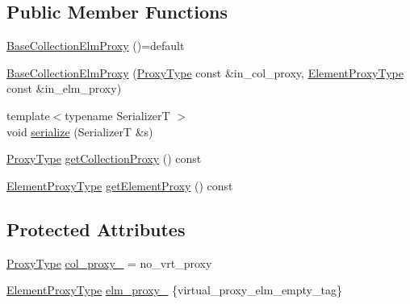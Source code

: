 \subsection*{Public Member Functions}
\begin{DoxyCompactItemize}
\item 
\hyperlink{structvt_1_1vrt_1_1collection_1_1_base_collection_elm_proxy_a2d69acf294b3c84033654a280a2b03d9}{Base\+Collection\+Elm\+Proxy} ()=default
\item 
\hyperlink{structvt_1_1vrt_1_1collection_1_1_base_collection_elm_proxy_a3b6fc7db3f5e10838e11615570ec067f}{Base\+Collection\+Elm\+Proxy} (\hyperlink{structvt_1_1vrt_1_1collection_1_1_base_collection_elm_proxy_af80f1576659b626a30828c6d85eca926}{Proxy\+Type} const \&in\+\_\+col\+\_\+proxy, \hyperlink{structvt_1_1vrt_1_1collection_1_1_base_collection_elm_proxy_a0f37a49c04c28fdc6ea8665aefc2f40c}{Element\+Proxy\+Type} const \&in\+\_\+elm\+\_\+proxy)
\item 
{\footnotesize template$<$typename SerializerT $>$ }\\void \hyperlink{structvt_1_1vrt_1_1collection_1_1_base_collection_elm_proxy_ac49c4e9d158a3d3c874f1dcfb5a8505c}{serialize} (SerializerT \&s)
\item 
\hyperlink{structvt_1_1vrt_1_1collection_1_1_base_collection_elm_proxy_af80f1576659b626a30828c6d85eca926}{Proxy\+Type} \hyperlink{structvt_1_1vrt_1_1collection_1_1_base_collection_elm_proxy_ae2b8c7f266600f1c68c2036f6be2a463}{get\+Collection\+Proxy} () const
\item 
\hyperlink{structvt_1_1vrt_1_1collection_1_1_base_collection_elm_proxy_a0f37a49c04c28fdc6ea8665aefc2f40c}{Element\+Proxy\+Type} \hyperlink{structvt_1_1vrt_1_1collection_1_1_base_collection_elm_proxy_a3d5a9639713eabd4705e2c6dc5b6eb5d}{get\+Element\+Proxy} () const
\end{DoxyCompactItemize}
\subsection*{Protected Attributes}
\begin{DoxyCompactItemize}
\item 
\hyperlink{structvt_1_1vrt_1_1collection_1_1_base_collection_elm_proxy_af80f1576659b626a30828c6d85eca926}{Proxy\+Type} \hyperlink{structvt_1_1vrt_1_1collection_1_1_base_collection_elm_proxy_a6613b91da1dbba1f1aa220ac684dfe84}{col\+\_\+proxy\+\_\+} = no\+\_\+vrt\+\_\+proxy
\item 
\hyperlink{structvt_1_1vrt_1_1collection_1_1_base_collection_elm_proxy_a0f37a49c04c28fdc6ea8665aefc2f40c}{Element\+Proxy\+Type} \hyperlink{structvt_1_1vrt_1_1collection_1_1_base_collection_elm_proxy_a2209d932a492ec78d0d086a51ab9460e}{elm\+\_\+proxy\+\_\+} \{virtual\+\_\+proxy\+\_\+elm\+\_\+empty\+\_\+tag\}
\end{DoxyCompactItemize}


